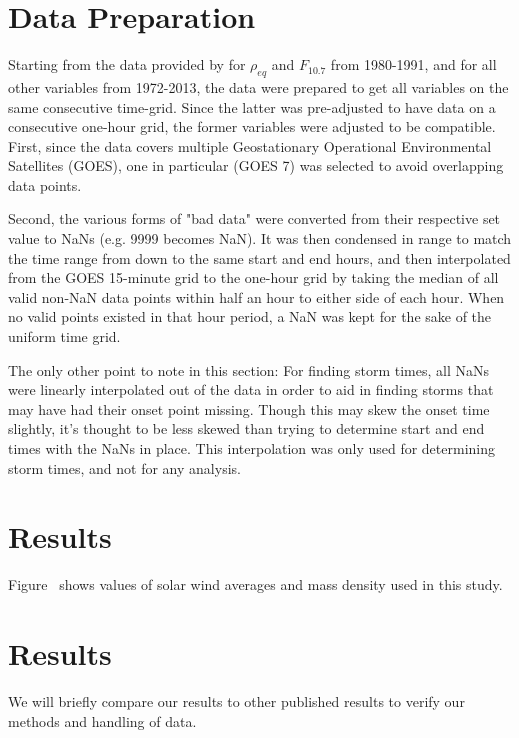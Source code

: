 \documentclass[10pt,twocolumn]{article}
\begin{document}
\section{Data Preparation}
Starting from the data provided by \cite{Denton} for $\rho_{eq}$ and $F_{10.7}$ from 1980-1991, and \cite{Reconstruction} for all other variables from 1972-2013, the data were prepared to get all variables on the same consecutive time-grid. Since the latter was pre-adjusted to have data on a consecutive one-hour grid, the former variables were adjusted to be compatible. First, since the data covers multiple Geostationary Operational Environmental Satellites (GOES), one in particular (GOES 7) was selected to avoid overlapping data points. 

Second, the various forms of "bad data" were converted from their respective set value to NaNs (e.g. 9999 becomes NaN). It was then condensed in range to match the time range from \cite{Reconstruction} down to the same start and end hours, and then interpolated from the GOES 15-minute grid to the one-hour grid by taking the median of all valid non-NaN data points within half an hour to either side of each hour. When no valid points existed in that hour period, a NaN was kept for the sake of the uniform time grid.

The only other point to note in this section: For finding storm times, all NaNs were linearly interpolated out of the data in order to aid in finding storms that may have had their onset point missing. Though this may skew the onset time slightly, it's thought to be less skewed than trying to determine start and end times with the NaNs in place. This interpolation was only used for determining storm times, and not for any analysis.



\section{Results}

Figure~\label{AllData} shows values of solar wind averages and mass density used in this study.

\section{Results}

We will briefly compare our results to other published results to verify our methods and handling of data. 
\end{document}
